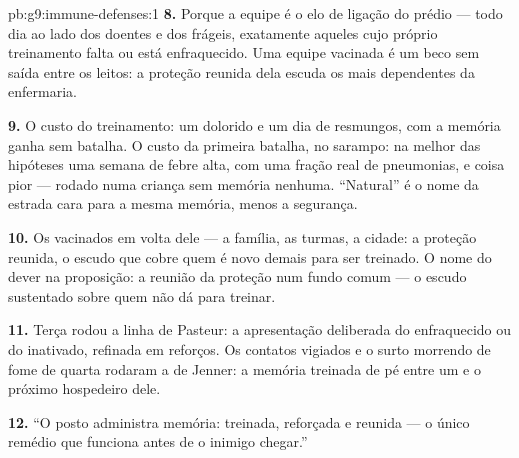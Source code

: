 \begin{solution}{pb:g9:immune-defenses:1}
\textbf{8.} Porque a equipe é o elo de ligação do prédio ---
todo dia ao lado dos doentes e dos frágeis, exatamente
aqueles cujo próprio treinamento falta ou está enfraquecido.
Uma equipe vacinada é um beco sem saída entre os leitos: a
proteção reunida dela escuda os mais dependentes da
enfermaria.

\textbf{9.} O custo do treinamento: um  dolorido e um
dia de resmungos, com a memória ganha sem batalha. O custo da
primeira batalha, no sarampo: na melhor das hipóteses uma
semana de febre alta, com uma fração real de pneumonias, e
coisa pior --- rodado numa criança sem memória nenhuma.
``Natural'' é o nome da estrada cara para a mesma memória,
menos a segurança.

\textbf{10.} Os vacinados em volta dele --- a família, as
turmas, a cidade: a proteção reunida, o escudo que cobre quem
é novo demais para ser treinado. O nome do dever na
proposição: a reunião da proteção num fundo comum --- o
escudo sustentado sobre quem não dá para treinar.

\textbf{11.} Terça rodou a linha de Pasteur: a apresentação
deliberada do enfraquecido ou do inativado, refinada em
reforços. Os contatos vigiados e o surto morrendo de fome de
quarta rodaram a de Jenner: a memória treinada de pé entre um
 e o próximo hospedeiro dele.

\textbf{12.} ``O posto administra memória: treinada,
reforçada e reunida --- o único remédio que funciona antes de
o inimigo chegar.''
\end{solution}
